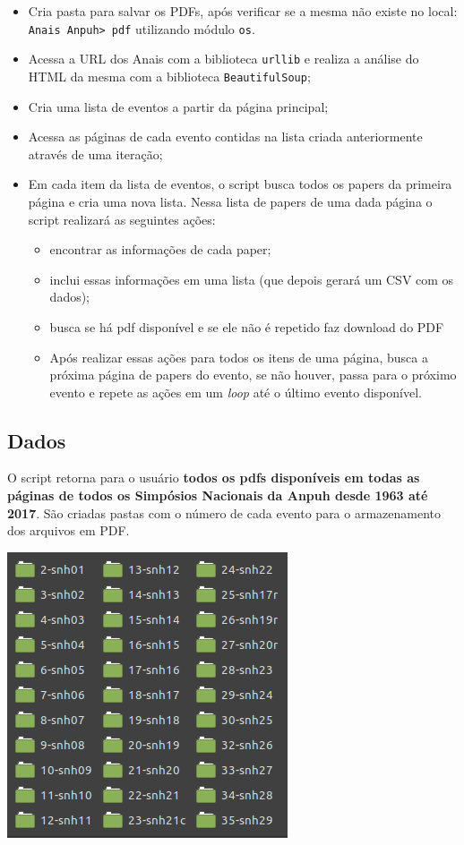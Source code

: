 \documentclass[
]{book}
\providecommand{\tightlist}{%
  \setlength{\itemsep}{0pt}\setlength{\parskip}{0pt}}
\begin{document}
\begin{itemize}
\tightlist
\item
  Cria pasta para salvar os PDFs, após verificar se a mesma não existe no local: \texttt{Anais\ Anpuh\textgreater{}\ pdf} utilizando módulo \texttt{os}.
\item
  Acessa a URL dos Anais com a biblioteca \texttt{urllib} e realiza a análise do HTML da mesma com a biblioteca \texttt{BeautifulSoup};
\item
  Cria uma lista de eventos a partir da página principal;
\item
  Acessa as páginas de cada evento contidas na lista criada anteriormente através de uma iteração;
\item
  Em cada item da lista de eventos, o script busca todos os papers da primeira página e cria uma nova lista. Nessa lista de papers de uma dada página o script realizará as seguintes ações:

  \begin{itemize}
  \tightlist
  \item
    encontrar as informações de cada paper;
  \item
    inclui essas informações em uma lista (que depois gerará um CSV com os dados);
  \item
    busca se há pdf disponível e se ele não é repetido faz download do PDF
  \item
    Após realizar essas ações para todos os itens de uma página, busca a próxima página de papers do evento, se não houver, passa para o próximo evento e repete as ações em um \emph{loop} até o último evento disponível.
  \end{itemize}
\end{itemize}

\hypertarget{dados}{%
\subsection{Dados}\label{dados}}

O script retorna para o usuário \textbf{todos os pdfs disponíveis em todas as páginas de todos os Simpósios Nacionais da Anpuh desde 1963 até 2017}. São criadas pastas com o número de cada evento para o armazenamento dos arquivos em PDF.

\includegraphics{img/pastas.png}
\end{document}
